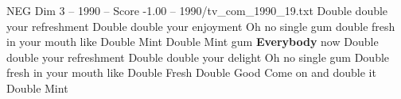 \begin{textsample}{NEG Dim 3 – 1990 – Score -1.00 – 1990/tv\_com\_1990\_19.txt}  \label{ex:f3_neg_026}
Double double your refreshment Double double your enjoyment Oh no single gum double fresh in your mouth like Double Mint Double Mint gum \textbf{Everybody} now Double double your refreshment Double double your delight Oh no single gum Double fresh in your mouth like Double Fresh Double Good Come on and double it Double Mint

\end{textsample}
